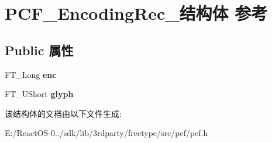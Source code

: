 \hypertarget{struct_p_c_f___encoding_rec__}{}\section{P\+C\+F\+\_\+\+Encoding\+Rec\+\_\+结构体 参考}
\label{struct_p_c_f___encoding_rec__}
\subsection*{Public 属性}
\begin{DoxyCompactItemize}
\item 
\mbox{\label{struct_p_c_f___encoding_rec___a4f4e6dc5a2e740272e27b56be171a312}} 
F\+T\+\_\+\+Long {\bfseries enc}
\item 
\mbox{\label{struct_p_c_f___encoding_rec___ad12019ac053d2a3d855a414116553cbe}} 
F\+T\+\_\+\+U\+Short {\bfseries glyph}
\end{DoxyCompactItemize}


该结构体的文档由以下文件生成\+:\begin{DoxyCompactItemize}
\item 
E\+:/\+React\+O\+S-\/0../sdk/lib/3rdparty/freetype/src/pcf/pcf.\+h\end{DoxyCompactItemize}
